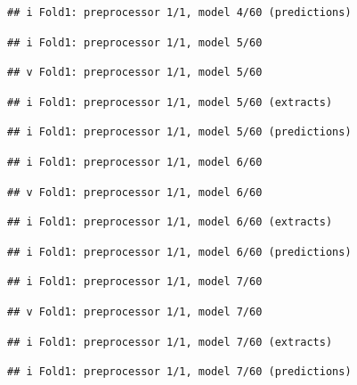 \documentclass[
]{article}
\begin{document}
\begin{verbatim}
## i Fold1: preprocessor 1/1, model 4/60 (predictions)
\end{verbatim}

\begin{verbatim}
## i Fold1: preprocessor 1/1, model 5/60
\end{verbatim}

\begin{verbatim}
## v Fold1: preprocessor 1/1, model 5/60
\end{verbatim}

\begin{verbatim}
## i Fold1: preprocessor 1/1, model 5/60 (extracts)
\end{verbatim}

\begin{verbatim}
## i Fold1: preprocessor 1/1, model 5/60 (predictions)
\end{verbatim}

\begin{verbatim}
## i Fold1: preprocessor 1/1, model 6/60
\end{verbatim}

\begin{verbatim}
## v Fold1: preprocessor 1/1, model 6/60
\end{verbatim}

\begin{verbatim}
## i Fold1: preprocessor 1/1, model 6/60 (extracts)
\end{verbatim}

\begin{verbatim}
## i Fold1: preprocessor 1/1, model 6/60 (predictions)
\end{verbatim}

\begin{verbatim}
## i Fold1: preprocessor 1/1, model 7/60
\end{verbatim}

\begin{verbatim}
## v Fold1: preprocessor 1/1, model 7/60
\end{verbatim}

\begin{verbatim}
## i Fold1: preprocessor 1/1, model 7/60 (extracts)
\end{verbatim}

\begin{verbatim}
## i Fold1: preprocessor 1/1, model 7/60 (predictions)
\end{verbatim}
\end{document}
